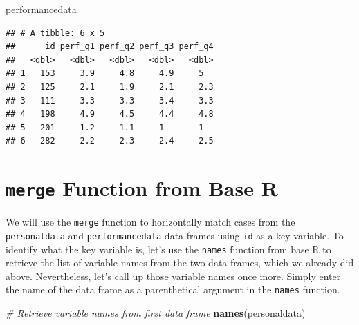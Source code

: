 \documentclass[]{book}
\newenvironment{Shaded}{\begin{snugshade}}{\end{snugshade}}
\newcommand{\KeywordTok}[1]{\textcolor[rgb]{0.13,0.29,0.53}{\textbf{#1}}}
\newcommand{\DecValTok}[1]{\textcolor[rgb]{0.00,0.00,0.81}{#1}}
\newcommand{\StringTok}[1]{\textcolor[rgb]{0.31,0.60,0.02}{#1}}
\newcommand{\CommentTok}[1]{\textcolor[rgb]{0.56,0.35,0.01}{\textit{#1}}}
\newcommand{\OperatorTok}[1]{\textcolor[rgb]{0.81,0.36,0.00}{\textbf{#1}}}
\newcommand{\NormalTok}[1]{#1}
\begin{document}
\begin{Shaded}
\begin{Highlighting}[]
\NormalTok{performancedata}
\end{Highlighting}
\end{Shaded}

\begin{verbatim}
## # A tibble: 6 x 5
##      id perf_q1 perf_q2 perf_q3 perf_q4
##   <dbl>   <dbl>   <dbl>   <dbl>   <dbl>
## 1   153     3.9     4.8     4.9     5  
## 2   125     2.1     1.9     2.1     2.3
## 3   111     3.3     3.3     3.4     3.3
## 4   198     4.9     4.5     4.4     4.8
## 5   201     1.2     1.1     1       1  
## 6   282     2.2     2.3     2.4     2.5
\end{verbatim}

\begin{Shaded}
\end{Shaded}

\section*{\texorpdfstring{\texttt{merge} Function from Base
R}{merge Function from Base R}}\label{join_supp}

We will use the \texttt{merge} function to horizontally match cases from
the \texttt{personaldata} and \texttt{performancedata} data frames using
\texttt{id} as a key variable. To identify what the key variable is,
let's use the \texttt{names} function from base R to retrieve the list
of variable names from the two data frames, which we already did above.
Nevertheless, let's call up those variable names once more. Simply enter
the name of the data frame as a parenthetical argument in the
\texttt{names} function.

\begin{Shaded}
\begin{Highlighting}[]
\CommentTok{# Retrieve variable names from first data frame}
\KeywordTok{names}\NormalTok{(personaldata)}
\end{Highlighting}
\end{Shaded}
\end{document}
